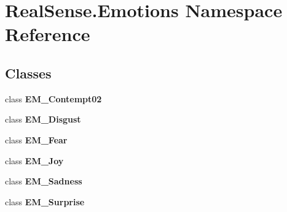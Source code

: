 \section{Real\+Sense.\+Emotions Namespace Reference}
\label{namespace_real_sense_1_1_emotions}
\subsection*{Classes}
\begin{DoxyCompactItemize}
\item 
class \textbf{ E\+M\+\_\+\+Contempt02}
\item 
class \textbf{ E\+M\+\_\+\+Disgust}
\item 
class \textbf{ E\+M\+\_\+\+Fear}
\item 
class \textbf{ E\+M\+\_\+\+Joy}
\item 
class \textbf{ E\+M\+\_\+\+Sadness}
\item 
class \textbf{ E\+M\+\_\+\+Surprise}
\end{DoxyCompactItemize}

